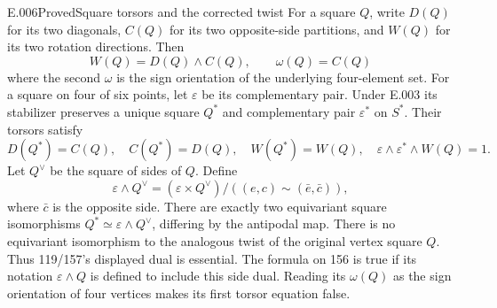 \begin{saresult}{E.006}{Proved}{Square torsors and the corrected twist}
For a square $Q$, write $D(Q)$ for its two diagonals, $C(Q)$ for its two
opposite-side partitions, and $W(Q)$ for its two rotation directions.
Then
\[
 W(Q)=D(Q)\wedge C(Q),\qquad\omega(Q)=C(Q)
\]
where the second $\omega$ is the sign orientation of the underlying
four-element set. For a square on four of six points, let
$\varepsilon$ be its complementary pair. Under E.003 its stabilizer
preserves a unique square $Q^*$ and complementary pair $\varepsilon^*$
on $S^*$. Their torsors satisfy
\[
 D(Q^*)=C(Q),\quad C(Q^*)=D(Q),\quad
 W(Q^*)=W(Q),\quad
 \varepsilon\wedge\varepsilon^*\wedge W(Q)=1.
\]
Let $Q^\vee$ be the square of sides of $Q$. Define
\[
 \varepsilon\wedge Q^\vee
 = (\varepsilon\times Q^\vee)/((e,c)\sim(\bar e,\bar c)),
\]
where $\bar c$ is the opposite side. There are exactly two equivariant
square isomorphisms
$Q^*\simeq\varepsilon\wedge Q^\vee$, differing by the antipodal map.
There is no equivariant isomorphism to the analogous twist of the
original vertex square $Q$. Thus 119/157's displayed dual is essential.
The formula on 156 is true if its notation $\varepsilon\wedge Q$
is defined to include this side dual. Reading its $\omega(Q)$ as the
sign orientation of four vertices makes its first torsor equation false.
\end{saresult}
